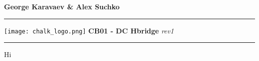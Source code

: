 \documentclass{article}
\begin{document}
\Huge{\textbf{George Karavaev \qquad \& \qquad  Alex Suchko}}
\hrule  
\vspace{0.1in}
\texttt{[image: chalk\_logo.png]}
\Huge{\quad \textbf{CB01 - DC Hbridge \qquad \quad} \emph{rev1}} 
\vspace{0.05in}
\hrule 
\vspace{0.05in}

Hi
\end{document}
